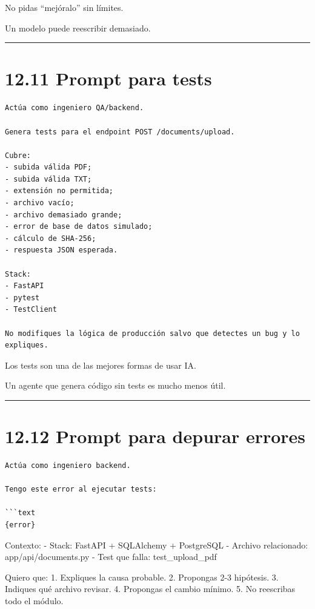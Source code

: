No pidas ``mejóralo'' sin límites.

Un modelo puede reescribir demasiado.

\begin{center}\rule{0.5\linewidth}{0.5pt}\end{center}

\section{12.11 Prompt para tests}\label{prompt-para-tests}

\begin{lstlisting}
Actúa como ingeniero QA/backend.

Genera tests para el endpoint POST /documents/upload.

Cubre:
- subida válida PDF;
- subida válida TXT;
- extensión no permitida;
- archivo vacío;
- archivo demasiado grande;
- error de base de datos simulado;
- cálculo de SHA-256;
- respuesta JSON esperada.

Stack:
- FastAPI
- pytest
- TestClient

No modifiques la lógica de producción salvo que detectes un bug y lo expliques.
\end{lstlisting}

Los tests son una de las mejores formas de usar IA.

Un agente que genera código sin tests es mucho menos útil.

\begin{center}\rule{0.5\linewidth}{0.5pt}\end{center}

\section{12.12 Prompt para depurar
errores}\label{prompt-para-depurar-errores}

\begin{lstlisting}
Actúa como ingeniero backend.

Tengo este error al ejecutar tests:

```text
{error}
\end{lstlisting}

Contexto: - Stack: FastAPI + SQLAlchemy + PostgreSQL - Archivo
relacionado: app/api/documents.py - Test que falla: test\_upload\_pdf

Quiero que: 1. Expliques la causa probable. 2. Propongas 2-3 hipótesis.
3. Indiques qué archivo revisar. 4. Propongas el cambio mínimo. 5. No
reescribas todo el módulo.

